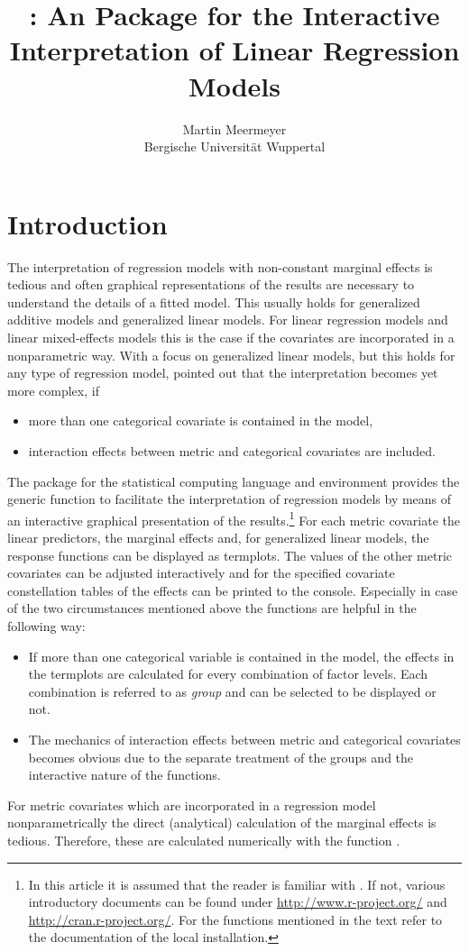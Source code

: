 \documentclass[nojss]{jss}
\author{Martin Meermeyer\\ Bergische Universit\"at Wuppertal}
\title{\pkg{LinRegInteractive}: An \proglang{R} Package for the Interactive Interpretation of Linear Regression Models}
\begin{document}
\section{Introduction} \label{sec-intro}
The interpretation of regression models with non-constant marginal effects is tedious and often graphical representations of the results are necessary to understand the details of a fitted model. This usually holds for generalized additive models and generalized linear models. For linear regression models and linear mixed-effects models this is the case if the covariates are incorporated in a nonparametric way.  With a focus on generalized linear models, but this holds for any type of regression model, \citet{Hoet2007} pointed out that the interpretation becomes yet more complex, if
\begin{itemize} [leftmargin=1cm, rightmargin=0.5cm, label=$\bullet$]
\item more than one categorical covariate is contained in the model,
\item interaction effects between metric and categorical covariates are included.
\end{itemize}


The package  \citep{Meer2014} for the statistical computing language and environment  \citep{RCore2014} provides the generic function  to facilitate the interpretation of regression models by means of an interactive graphical presentation of the results.\footnote{In this article it is assumed that the reader is familiar with . If not, various introductory documents can be found under \url{http://www.r-project.org/} and \url{http://cran.r-project.org/}. For the functions mentioned in the text refer to the documentation of the local  installation.} For each metric covariate the linear predictors, the marginal effects and, for generalized linear models, the response functions can be displayed as termplots. The values of the other metric covariates can be adjusted interactively and for the specified covariate constellation tables of the effects can be printed to the console. Especially in case of the two circumstances mentioned above the functions are helpful in the following way:
\begin{itemize} [leftmargin=1cm, rightmargin=0.5cm, label=$\bullet$]
\item If more than one categorical variable is contained in the model, the effects in the termplots are calculated for every combination of factor levels. Each combination is referred to as \emph{group} and can be selected to be displayed or not.
\item The mechanics of interaction effects between metric and categorical covariates becomes obvious due to the separate treatment of the groups  and the interactive nature of the functions.
\end{itemize}
For metric covariates which are incorporated in a regression model nonparametrically the direct (analytical) calculation of the marginal effects is tedious. Therefore, these are calculated numerically with the function . 
\end{document}
